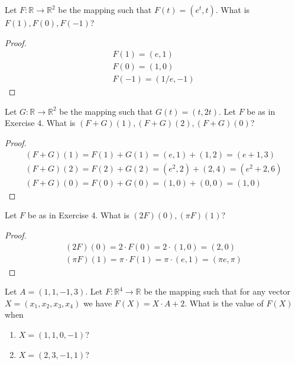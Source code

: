 \begin{exercise}
    Let $F: \mathbb{R} \to \mathbb{R}^{2}$ be the mapping such that $F(t) = (e^{t}, t)$. What is $F(1), F(0), F(-1)$?
\end{exercise}

\begin{proof}
    \[
        \begin{split}
            F(1) = (e, 1) \\
            F(0) = (1, 0) \\
            F(-1) = (1/e, -1)
        \end{split}
    \]
\end{proof}

\begin{exercise}
    Let $G: \mathbb{R} \to \mathbb{R}^{2}$ be the mapping such that $G(t) = (t, 2t)$. Let $F$ be as in Exercise 4. What is $(F + G)(1), (F + G)(2), (F + G)(0)$?
\end{exercise}

\begin{proof}
    \[
        \begin{split}
            (F + G)(1) = F(1) + G(1) = (e, 1) + (1, 2) = (e + 1, 3) \\
            (F + G)(2) = F(2) + G(2) = (e^{2}, 2) + (2, 4) = (e^{2} + 2, 6) \\
            (F + G)(0) = F(0) + G(0) = (1, 0) + (0, 0) = (1, 0)
        \end{split}
    \]
\end{proof}

\begin{exercise}
    Let $F$ be as in Exercise 4. What is $(2F)(0), (\pi F)(1)$?
\end{exercise}

\begin{proof}
    \[
        \begin{split}
            (2F)(0) = 2\cdot F(0) = 2\cdot (1, 0) = (2, 0) \\
            (\pi F)(1) = \pi\cdot F(1) = \pi\cdot (e, 1) = (\pi e, \pi)
        \end{split}
    \]
\end{proof}

\begin{exercise}
    Let $A = (1, 1, -1, 3)$. Let $F: \mathbb{R}^{4} \to \mathbb{R}$ be the mapping such that for any vector $X = (x_{1}, x_{2}, x_{3}, x_{4})$ we have $F(X) = X\cdot A + 2$. What is the value of $F(X)$ when
    \begin{enumerate}[label={(\alph*)}]
        \item $X = (1, 1, 0, -1)$?
        \item $X = (2, 3, -1, 1)$?
    \end{enumerate}
\end{exercise}

